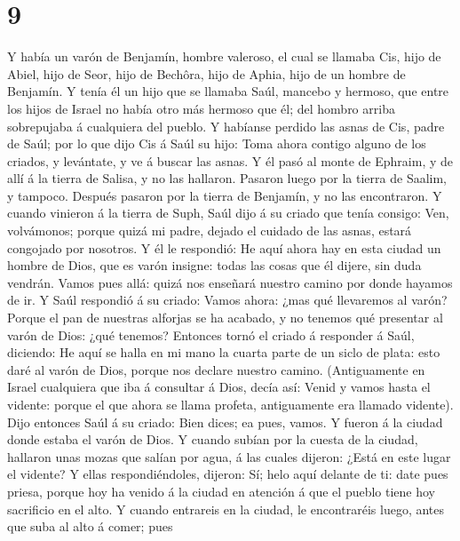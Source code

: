 \hypertarget{section-8}{%
\section{9}\label{section-8}}

 Y había un varón de Benjamín, hombre valeroso, el cual se
llamaba Cis, hijo de Abiel, hijo de Seor, hijo de Bechôra, hijo de
Aphia, hijo de un hombre de Benjamín.  Y tenía él un hijo
que se llamaba Saúl, mancebo y hermoso, que entre los hijos de Israel no
había otro más hermoso que él; del hombro arriba sobrepujaba á
cualquiera del pueblo.  Y habíanse perdido las asnas de
Cis, padre de Saúl; por lo que dijo Cis á Saúl su hijo: Toma ahora
contigo alguno de los criados, y levántate, y ve á buscar las asnas.
 Y él pasó al monte de Ephraim, y de allí á la tierra de
Salisa, y no las hallaron. Pasaron luego por la tierra de Saalim, y
tampoco. Después pasaron por la tierra de Benjamín, y no las
encontraron.  Y cuando vinieron á la tierra de Suph, Saúl
dijo á su criado que tenía consigo: Ven, volvámonos; porque quizá mi
padre, dejado el cuidado de las asnas, estará congojado por nosotros.
 Y él le respondió: He aquí ahora hay en esta ciudad un
hombre de Dios, que es varón insigne: todas las cosas que él dijere, sin
duda vendrán. Vamos pues allá: quizá nos enseñará nuestro camino por
donde hayamos de ir.  Y Saúl respondió á su criado: Vamos
ahora: ¿mas qué llevaremos al varón? Porque el pan de nuestras alforjas
se ha acabado, y no tenemos qué presentar al varón de Dios: ¿qué
tenemos?  Entonces tornó el criado á responder á Saúl,
diciendo: He aquí se halla en mi mano la cuarta parte de un siclo de
plata: esto daré al varón de Dios, porque nos declare nuestro camino.
 (Antiguamente en Israel cualquiera que iba á consultar á
Dios, decía así: Venid y vamos hasta el vidente: porque el que ahora se
llama profeta, antiguamente era llamado vidente).  Dijo
entonces Saúl á su criado: Bien dices; ea pues, vamos. Y fueron á la
ciudad donde estaba el varón de Dios.  Y cuando subían
por la cuesta de la ciudad, hallaron unas mozas que salían por agua, á
las cuales dijeron: ¿Está en este lugar el vidente?  Y
ellas respondiéndoles, dijeron: Sí; helo aquí delante de ti: date pues
priesa, porque hoy ha venido á la ciudad en atención á que el pueblo
tiene hoy sacrificio en el alto.  Y cuando entrareis en
la ciudad, le encontraréis luego, antes que suba al alto á comer; pues

